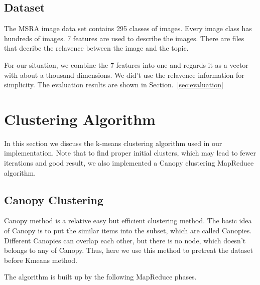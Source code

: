 \documentclass[a4paper,11pt]{article}
\begin{document}
\subsection{Dataset}
The MSRA image data set contains 295 classes of images. Every image class
has hundreds of images. 7 features are used to describe the images. There are
files that decribe the relavence between the image and the topic.

For our situation, we combine the 7 features into one and regards it as a vector
with about a thousand dimensions. We did't use the relavence information for
simplicity. The evaluation results are shown in Section.~\ref{sec:evaluation}

\section{Clustering Algorithm}
In this section we discuss the k-means clustering algorithm used in our
implementation. Note that to find proper initial clusters, which may lead to
fewer iterations and good result, we also implemented a Canopy clustering
MapReduce algorithm.
\subsection{Canopy Clustering}
Canopy method is a relative easy but efficient clustering method. The basic 
idea of Canopy is to put the similar items into the subset, which are called 
Canopies. Different Canopies can overlap each other, but there is no node, 
which doesn't belongs to any of Canopy. Thus, here we use this method to 
pretreat the dataset before Kmeans method. 

The algorithm is built up by the following MapReduce phases.
\end{document}
